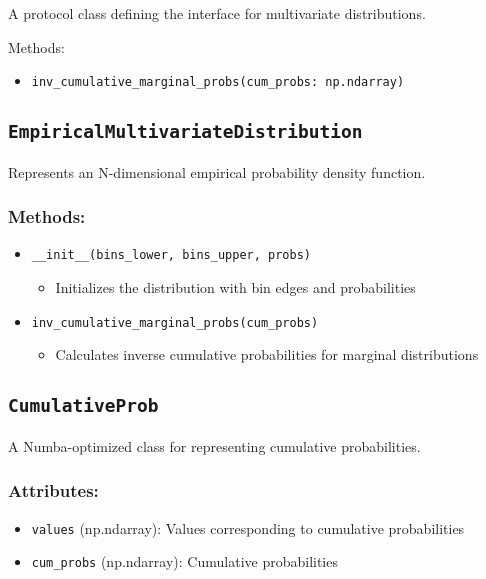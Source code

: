 \documentclass{article}
\begin{document}
A protocol class defining the interface for multivariate distributions.

Methods:
\begin{itemize}
    \item \texttt{inv\_cumulative\_marginal\_probs(cum\_probs: np.ndarray)}
\end{itemize}

\subsection{\texttt{EmpiricalMultivariateDistribution}}

Represents an N-dimensional empirical probability density function.

\subsubsection{Methods:}

\begin{itemize}
    \item \texttt{\_\_init\_\_(bins\_lower, bins\_upper, probs)}
    \begin{itemize}
        \item Initializes the distribution with bin edges and probabilities
    \end{itemize}
    \item \texttt{inv\_cumulative\_marginal\_probs(cum\_probs)}
    \begin{itemize}
        \item Calculates inverse cumulative probabilities for marginal distributions
    \end{itemize}
\end{itemize}

\subsection{\texttt{CumulativeProb}}

A Numba-optimized class for representing cumulative probabilities.

\subsubsection{Attributes:}
\begin{itemize}
    \item \texttt{values} (np.ndarray): Values corresponding to cumulative probabilities
    \item \texttt{cum\_probs} (np.ndarray): Cumulative probabilities
\end{itemize}
\end{document}
